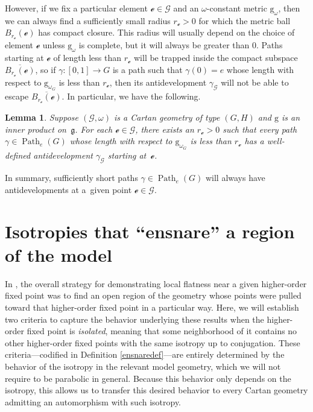 \documentclass[pdftex]{sigma}
\numberwithin{equation}{section}
\newtheorem{Lemma}[Theorem]{Lemma}
\theoremstyle{definition}
\DeclareMathOperator{\Path}{Path}
\begin{document}
However, if we fix a particular element $\mathscr{e}\in\mathscr{G}$ and an $\omega$-constant metric $\mathrm{g}_\omega$, then we can always find a sufficiently small radius $r_\mathscr{e}>0$ for which the metric ball $B_{r_\mathscr{e}}(\mathscr{e})$ has compact closure. This radius will usually depend on the choice of element $\mathscr{e}$ unless $\mathrm{g}_\omega$ is complete, but it will always be greater than $0$. Paths starting at $\mathscr{e}$ of length less than $r_\mathscr{e}$ will be trapped inside the compact subspace $\overline{B_{r_\mathscr{e}}(\mathscr{e})}$, so if $\gamma \colon [0,1]\to G$ is a path such that $\gamma(0)=e$ whose length with respect to $\mathrm{g}_{\omega_G}$ is less than $r_\mathscr{e}$, then its antidevelopment $\gamma_\mathscr{G}$ will not be able to escape $\overline{B_{r_\mathscr{e}}(\mathscr{e})}$. In particular, we have the following.

\begin{Lemma}\label{shortantidevs} Suppose $(\mathscr{G},\omega)$ is a Cartan geometry of type $(G,H)$ and $\mathrm{g}$ is an inner product on~$\mathfrak{g}$. For each $\mathscr{e}\in\mathscr{G}$, there exists an $r_\mathscr{e}>0$ such that every path $\gamma\in\Path_e(G)$ whose length with respect to $\mathrm{g}_{\omega_G}$ is less than $r_\mathscr{e}$ has a well-defined antidevelopment $\gamma_\mathscr{G}$ starting at~$\mathscr{e}$.\end{Lemma}

In summary, sufficiently short paths $\gamma\in\Path_e(G)$ will always have antidevelopments at a~given point $\mathscr{e}\in\mathscr{G}$.

\section{Isotropies that ``ensnare'' a region of the model}\label{snares}
In \cite{CapMelnick2013,MelnickNeusser2016}, the overall strategy for demonstrating local flatness near a given higher-order fixed point was to find an open region of the geometry whose points were pulled toward that higher-order fixed point in a particular way. Here, we will establish two criteria to capture the behavior underlying these results when the higher-order fixed point is \textit{isolated}, meaning that some neighborhood of it contains no other higher-order fixed points with the same isotropy up to conjugation. These criteria---codified in Definition \ref{ensnaredef}---are entirely determined by the behavior of the isotropy in the relevant model geometry, which we will not require to be parabolic in general. Because this behavior only depends on the isotropy, this allows us to transfer this desired behavior to every Cartan geometry admitting an automorphism with such isotropy.
\end{document}
